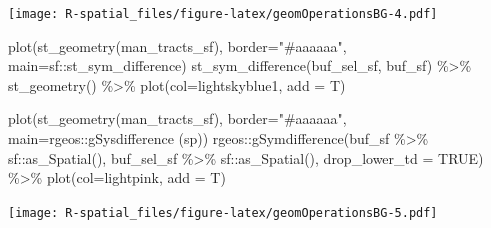 \documentclass[
  11pt,
]{book}
\newenvironment{Shaded}{\begin{snugshade}}{\end{snugshade}}
\newcommand{\AttributeTok}[1]{\textcolor[rgb]{0.77,0.63,0.00}{#1}}
\newcommand{\ConstantTok}[1]{\textcolor[rgb]{0.00,0.00,0.00}{#1}}
\newcommand{\FunctionTok}[1]{\textcolor[rgb]{0.00,0.00,0.00}{#1}}
\newcommand{\NormalTok}[1]{#1}
\newcommand{\SpecialCharTok}[1]{\textcolor[rgb]{0.00,0.00,0.00}{#1}}
\newcommand{\StringTok}[1]{\textcolor[rgb]{0.31,0.60,0.02}{#1}}
\begin{document}
\texttt{[image: R-spatial\_files/figure-latex/geomOperationsBG-4.pdf]}

\begin{Shaded}
\begin{Highlighting}[]
\FunctionTok{plot}\NormalTok{(}\FunctionTok{st\_geometry}\NormalTok{(man\_tracts\_sf), }\AttributeTok{border=}\StringTok{"\#aaaaaa"}\NormalTok{, }\AttributeTok{main=}\StringTok{\textquotesingle{}sf::st\_sym\_difference\textquotesingle{}}\NormalTok{)}
\FunctionTok{st\_sym\_difference}\NormalTok{(buf\_sel\_sf, buf\_sf) }\SpecialCharTok{\%\textgreater{}\%} 
  \FunctionTok{st\_geometry}\NormalTok{() }\SpecialCharTok{\%\textgreater{}\%} 
  \FunctionTok{plot}\NormalTok{(}\AttributeTok{col=}\StringTok{\textquotesingle{}lightskyblue1\textquotesingle{}}\NormalTok{, }\AttributeTok{add =}\NormalTok{ T)}

\FunctionTok{plot}\NormalTok{(}\FunctionTok{st\_geometry}\NormalTok{(man\_tracts\_sf), }\AttributeTok{border=}\StringTok{"\#aaaaaa"}\NormalTok{, }\AttributeTok{main=}\StringTok{\textquotesingle{}rgeos::gSysdifference (sp)\textquotesingle{}}\NormalTok{)}
\NormalTok{rgeos}\SpecialCharTok{::}\FunctionTok{gSymdifference}\NormalTok{(buf\_sf }\SpecialCharTok{\%\textgreater{}\%}\NormalTok{ sf}\SpecialCharTok{::}\FunctionTok{as\_Spatial}\NormalTok{(), }
\NormalTok{                      buf\_sel\_sf }\SpecialCharTok{\%\textgreater{}\%}\NormalTok{ sf}\SpecialCharTok{::}\FunctionTok{as\_Spatial}\NormalTok{(), }
                      \AttributeTok{drop\_lower\_td =} \ConstantTok{TRUE}\NormalTok{) }\SpecialCharTok{\%\textgreater{}\%} 
  \FunctionTok{plot}\NormalTok{(}\AttributeTok{col=}\StringTok{\textquotesingle{}lightpink\textquotesingle{}}\NormalTok{, }\AttributeTok{add =}\NormalTok{ T)}
\end{Highlighting}
\end{Shaded}

\texttt{[image: R-spatial\_files/figure-latex/geomOperationsBG-5.pdf]}
\end{document}

